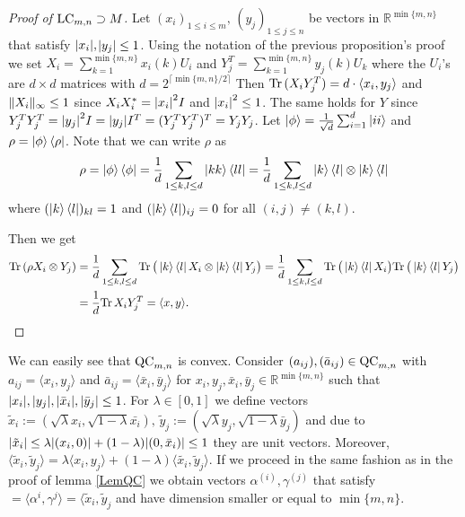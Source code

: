 \begin{proof}[Proof of $ \textup{LC}_{m,n} \supset M $]
	Let $ (x_i)_{1 \le i \le m}, \, (y_j)_{1 \le j \le n} $ be vectors in $\mathbb{R}^{\min \{ m,n \}}$ that satisfy 
	$ {\left|{x_i}\right|},$$ {\left|{y_j}\right|} \le 1 $. 
	Using the notation of the previous proposition's proof we set $ X_i = \sum_{k=1}^{\min \{m,n\}} x_i(k)U_i $ and $ Y_j^{T } = \sum_{k=1}^{\min \{m,n\}}y_j(k)U_k $ where the $ U_i $'s are $ d \times d $ matrices with $  d = 2^{\lceil \min \{m,n\}/2 \rceil} $
	Then $ \text{Tr} \, {(X_iY_j^T)}  = d\cdot \langle x_i, y_j \rangle  $ and $  \Vert {X_i} \Vert_{\infty} \le 1 $ since $ X_iX_i^* = {\left|{x_i}\right|}^2I $ and $ {\left|{x_i}\right|}^2 \le 1  $. The same holds for $ Y $ since $ Y_j^TY_j^T =   {\left|{y_j}\right|}^2I = {\left|{y_j}\right|}I^T = (Y_j^TY_j^T)^T = Y_jY_j  $.
	Let $ \ket{\phi} = \frac{1}{\sqrt{d}}\sum_{i= 1}^{d}\ket{ii} $ and $ \rho = \ket{\phi}\bra{\rho} $. Note that we can write $ \rho $ as
	\begin{align*}
		\rho = \ket{\phi}\bra{\phi} = \frac{1}{d}\sum_{1 \le k,l \le d}\ket{kk}\bra{ll} = \frac{1}{d} \sum_{1 \le k,l \le d}\ket{k}\bra{l} \otimes \ket{k}\bra{l}
	\end{align*}
	where $  (\ket{k}\bra{l})_{kl} = 1 $ and $ (\ket{k}\bra{l})_{ij} = 0 $ for all $ (i,j)\neq (k,l) $.
	
	Then we get 
	\begin{align}
		\text{Tr} \, {(\rho X_i \otimes Y_j)}  &=\frac{1}{d} \sum_{1 \le k,l \le d} \text{Tr} \, { \big (\ket{k}\bra{l}X_i \otimes \ket{k}\bra{l}Y_j \big )}  = \frac{1}{d} \sum_{1 \le k,l \le d} \text{Tr} \, {\big (\ket{k}\bra{l}X_i \big )}  \text{Tr} \, {\big (\ket{k}\bra{l}Y_j \big )}  \\
		&=  \frac{1}{d} \text{Tr} \, {X_iY_j^T}  = \langle x,y \rangle.
	\end{align}
\end{proof}
We can easily see that $ \textup{QC}_{m,n} $ is convex. Consider $ (a_{ij}), (\bar{a}_{ij}) \in \textup{QC}_{m,n} $ with $ a_{ij} = \langle x_i, y_j \rangle $ and $ \bar{a}_{ij} = \langle \bar{x}_i, \bar{y}_j \rangle $ for $ x_{i},y_j, \bar{x}_i,\bar{y}_j \in \mathbb{R}^{\min \{m,n\}} $ such that $ {\left|{x_i}\right|},{\left|{y_j}\right|}, {\left|{\bar{x}_i}\right|}, {\left|{\bar{y}_j}\right|} \le 1 $.
For $ \lambda \in [0,1] $ we define vectors $\tilde{x}_i:= (\sqrt{\lambda}x_i,\sqrt{1-\lambda}\bar{x_i}), \, \tilde{y}_j:= (\sqrt{\lambda}y_j, \sqrt{1-\lambda}\bar{y}_j) $ and due to  $ {\left|{\tilde{x}_i}\right|} \le \lambda {\left|{(x_i,0)}\right|} + (1-\lambda){\left|{(0,\bar{x}_i)}\right|} \le 1 $ they are unit vectors. Moreover, $ \langle \tilde{x}_i, \tilde{y}_j \rangle = \lambda \langle x_i,y_j \rangle + (1-\lambda) \langle \tilde{x_i},\tilde{y}_j \rangle$. If we proceed in the same fashion as in the proof of lemma \ref{LemQC} we obtain vectors 
$ \alpha^{(i)},\gamma^{(j)} $ that satisfy $= \langle \alpha^{i},\gamma^{j} \rangle = \langle \tilde{x} _i, \tilde{y}_j$ and have dimension smaller or equal to $ \min \{m,n\} $.


